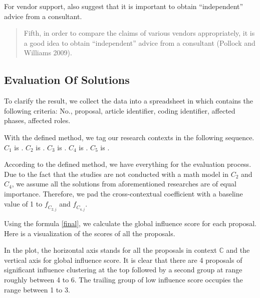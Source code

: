 For vendor support, \citeauthor{6} also suggest that it is important to obtain “independent” advice from a consultant.
\begin{quotation}
Fifth, in order to compare the claims of various vendors appropriately, it is a good idea to obtain “independent” advice from a consultant (Pollock and Williams 2009).
\end{quotation}

\subsection{Evaluation Of Solutions}
To clarify the result, we collect the data into a spreadsheet in which contains the following criteria: No., proposal, article identifier, coding identifier, affected phases, affected roles.

With the defined method, we tag our research contexts in the following sequence.
$C_{1}$ is .
$C_{2}$ is .
$C_{3}$ is .
$C_{4}$ is .
$C_{5}$ is .

According to the defined method, we have everything for the evaluation process. Due to the fact that the studies are not conducted with a math model in $C_{2}$ and $C_{4}$, we assume all the solutions from aforementioned researches are of equal importance. Therefore, we pad the cross-contextual coefficient with a baseline value of 1 to $\mathit{f_{C_{2,j}}}$ and $\mathit{f_{C_{4,j}}}$.

Using the formula \ref{final}, we calculate the global influence score for each proposal. Here is a visualization of the scores of all the proposals.

\begin{figure}[ht]
\centering
{}
\end{figure}

In the plot, the horizontal axis stands for all the proposals in context $\mathbb{C}$ and the vertical axis for global influence score. It is clear that there are 4 proposals of significant influence clustering at the top followed by a second group at range roughly between 4 to 6. The trailing group of low influence score occupies the range between 1 to 3.

